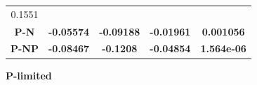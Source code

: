 \documentclass[]{article}
\begin{document}
\begin{longtable}[]{@{}ccccc@{}}
\begin{minipage}[t]{0.16\columnwidth}
0.1551
\strut\end{minipage}\tabularnewline
\begin{minipage}[t]{0.13\columnwidth}\centering\strut
\textbf{P-N}
\strut\end{minipage} &
\begin{minipage}[t]{0.16\columnwidth}\centering\strut
\textbf{-0.05574}
\strut\end{minipage} &
\begin{minipage}[t]{0.16\columnwidth}\centering\strut
\textbf{-0.09188}
\strut\end{minipage} &
\begin{minipage}[t]{0.16\columnwidth}\centering\strut
\textbf{-0.01961}
\strut\end{minipage} &
\begin{minipage}[t]{0.16\columnwidth}\centering\strut
\textbf{0.001056}
\strut\end{minipage}\tabularnewline
\begin{minipage}[t]{0.13\columnwidth}\centering\strut
\textbf{P-NP}
\strut\end{minipage} &
\begin{minipage}[t]{0.16\columnwidth}\centering\strut
\textbf{-0.08467}
\strut\end{minipage} &
\begin{minipage}[t]{0.16\columnwidth}\centering\strut
\textbf{-0.1208}
\strut\end{minipage} &
\begin{minipage}[t]{0.16\columnwidth}\centering\strut
\textbf{-0.04854}
\strut\end{minipage} &
\begin{minipage}[t]{0.16\columnwidth}\centering\strut
\textbf{1.564e-06}
\strut\end{minipage}\tabularnewline
\bottomrule
\end{longtable}

\textbf{P-limited}
\end{document}
